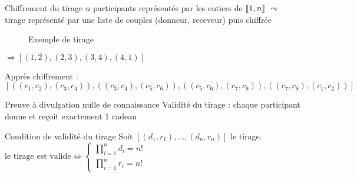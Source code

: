 \documentclass[10pt, compress]{beamer}
\begin{document}
  \begin{frame}{Chiffrement du tirage}
    $n$ participants représentés par les entiers de $\left\llbracket1, n\right\rrbracket$
    \bigbreak
    $\leadsto$ tirage représenté par une liste de couples (donneur, receveur) puis chiffrée
    \pause
    \bigbreak
    \begin{minipage}[h]{0.48\textwidth}
      \begin{figure}
        \caption{Exemple de tirage}
      \end{figure}
    \end{minipage}
    \begin{minipage}[h]{0.48\textwidth}
      $\Rightarrow [(1, 2), (2, 3), (3, 4), (4, 1)]$
    \end{minipage}
    Apprès chiffrement :
    $[((c_1, c_2), (c_3, c_4)), ((c_3, c_4), (c_5, c_6)), ((c_5, c_6), (c_7, c_8)), ((c_7, c_8), (c_1, c_2))]$
  \end{frame}

  \begin{frame}{Preuve à divulgation nulle de connaissance}
    Validité du tirage : chaque participant donne et reçoit exactement 1 cadeau
    \begin{alertblock}{Condition de validité du tirage}
      Soit $[(d_1, r_1), \ldots, (d_n, r_n)]$ le tirage.
        \(\text{le tirage est valide} \iff
        \begin{cases}
            \displaystyle\prod_{i=1}^nd_i=n ! \\
            \displaystyle\prod_{i=1}^nr_i=n !
        \end{cases}\)
    \end{alertblock}
  \end{frame}
\end{document}
